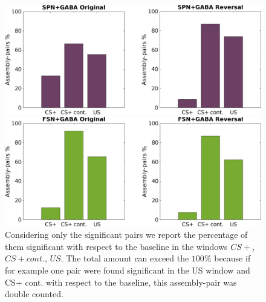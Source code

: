 \begin{figure}
    \centering
    \includegraphics[scale=0.4]{figures/SPN_GABAHisto.png}
    
    \vspace{1cm}
    
    \includegraphics[scale=0.4]{figures/FSN_GABAHisto.png}
    \caption{Considering only the significant pairs we report the percentage of them significant with respect to the baseline in the windows $CS+$, $CS+ cont.$, $US$. The total amount can exceed the $100\%$ because if for example one pair were found significant in the US window and CS+ cont. with respect to the baseline, this assembly-pair was double counted.}
    \label{fig:FriedHistoGABA}
\end{figure}\\
\pagebreak
